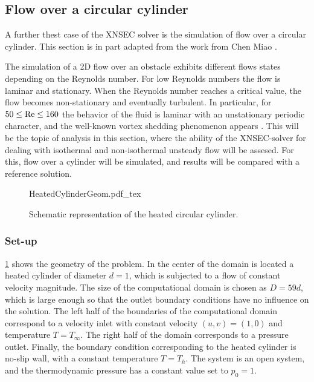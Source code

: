 \subsection{Flow over a circular cylinder}\label{ssec:FlowCircCyl}

A further thest case of the XNSEC solver is the simulation of flow over a circular cylinder. This section is in part adapted from the work from Chen Miao . %

The simulation of a 2D flow over an obstacle exhibits different flows states depending on the Reynolds number. For low Reynolds numbers the flow is laminar and stationary. When the Reynolds number reaches a critical value, the flow becomes non-stationary and eventually turbulent. In particular, for $50 \leq \text{Re} \leq 160$ the behavior of the fluid is laminar with an unstationary periodic character, and the well-known vortex shedding phenomenon appears 	\cite{sharmaHEATFLUIDFLOW2004}. This will be the topic of analysis in this section, where the ability of the XNSEC-solver for dealing with isothermal and non-isothermal unsteady flow will be assesed. For this, flow over a cylinder will be simulated, and results will be compared with a reference solution. 
\begin{figure}[b!]
	\begin{center}
		\def\svgwidth{0.88\textwidth}
		{HeatedCylinderGeom.pdf_tex}
		\caption{Schematic representation of the heated circular cylinder.}
		\label{fig:CircularCylinderGeom}
	\end{center}
\end{figure}
\subsubsection{Set-up}
\cref{fig:CircularCylinderGeom} shows the geometry of the problem. In the center of the domain is located a heated cylinder of diameter $d = 1$, which is subjected to a flow of constant velocity magnitude. The size of the computational domain is chosen as $D = 59d$, which is large enough so that the outlet boundary conditions have no influence on the solution. The left half of the boundaries of the computational domain correspond to a velocity inlet with constant velocity $(u,v) = (1,0)$ and temperature $T = T_\infty$. The right half of the domain corresponds to a pressure outlet. Finally, the boundary condition corresponding to the heated cylinder is no-slip wall, with a constant temperature $T = T_h$. The system is an open system, and the thermodynamic pressure has a constant value set to $p_0 = 1$.

